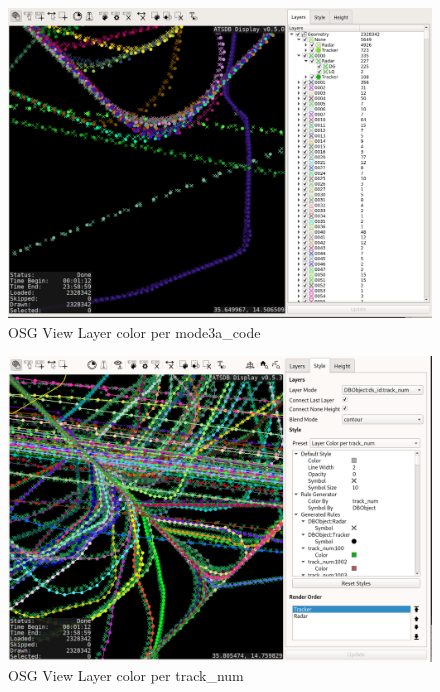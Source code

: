 \begin{figure}[H]
    \hspace*{-2.5cm}
    \includegraphics[width=19cm,frame]{figures/osgview_style_mode3a_code.png}
  \caption{OSG View Layer color per mode3a\_code}
\end{figure}

\begin{figure}[H]
    \hspace*{-2.5cm}
    \includegraphics[width=19cm,frame]{figures/osgview_style_track_num.png}
  \caption{OSG View Layer color per track\_num}
\end{figure}

